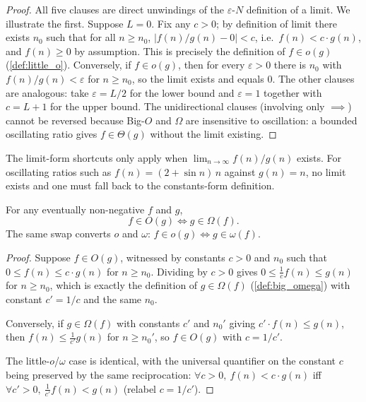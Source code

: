 \begin{proof}
\sketchproof All five clauses are direct unwindings of the $\varepsilon$-$N$ definition of a limit. We illustrate the first. Suppose $L = 0$. Fix any $c > 0$; by definition of limit there exists $n_0$ such that for all $n \ge n_0$, $|f(n)/g(n) - 0| < c$, i.e.\ $f(n) < c \cdot g(n)$, and $f(n) \ge 0$ by assumption. This is precisely the definition of $f \in o(g)$ (\cref{def:little_o}). Conversely, if $f \in o(g)$, then for every $\varepsilon > 0$ there is $n_0$ with $f(n)/g(n) < \varepsilon$ for $n \ge n_0$, so the limit exists and equals $0$. The other clauses are analogous: take $\varepsilon = L/2$ for the lower bound and $\varepsilon = 1$ together with $c = L+1$ for the upper bound. The unidirectional clauses (involving only $\implies$) cannot be reversed because Big-$O$ and $\Omega$ are insensitive to oscillation: a bounded oscillating ratio gives $f \in \Theta(g)$ without the limit existing.
\end{proof}

\begin{remark}
The limit-form shortcuts only apply when $\lim_{n \to \infty} f(n)/g(n)$ exists. For oscillating ratios such as $f(n) = (2 + \sin n)\, n$ against $g(n) = n$, no limit exists and one must fall back to the constants-form definition.
\end{remark}

\begin{theorem}
\label{thm:o_omega_dual}
For any eventually non-negative $f$ and $g$,
\[
  f \in O(g) \iff g \in \Omega(f).
\]
The same swap converts $o$ and $\omega$: $f \in o(g) \iff g \in \omega(f)$.
\end{theorem}

\begin{proof}
Suppose $f \in O(g)$, witnessed by constants $c > 0$ and $n_0$ such that $0 \le f(n) \le c \cdot g(n)$ for $n \ge n_0$. Dividing by $c > 0$ gives $0 \le \frac{1}{c} f(n) \le g(n)$ for $n \ge n_0$, which is exactly the definition of $g \in \Omega(f)$ (\cref{def:big_omega}) with constant $c' = 1/c$ and the same $n_0$.

Conversely, if $g \in \Omega(f)$ with constants $c'$ and $n_0'$ giving $c' \cdot f(n) \le g(n)$, then $f(n) \le \frac{1}{c'} g(n)$ for $n \ge n_0'$, so $f \in O(g)$ with $c = 1/c'$.

The little-$o$/$\omega$ case is identical, with the universal quantifier on the constant $c$ being preserved by the same reciprocation: $\forall c > 0,\ f(n) < c \cdot g(n)$ iff $\forall c' > 0,\ \frac{1}{c'} f(n) < g(n)$ (relabel $c = 1/c'$).
\end{proof}

